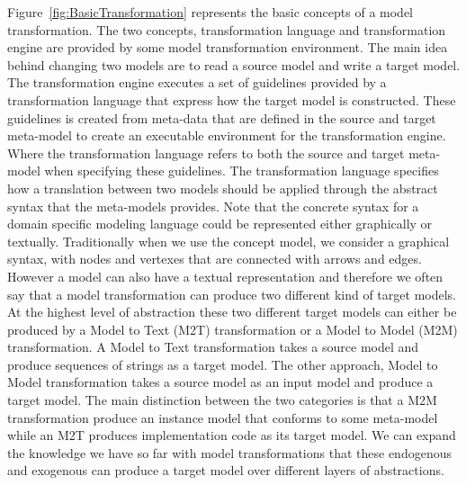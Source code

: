Figure~\ref{fig:BasicTransformation} represents the basic concepts
of a model transformation. The two concepts, transformation language and
transformation engine are provided by some model transformation environment.
The main idea behind changing two models are to read a source model and write a
target model. The transformation engine executes a set of guidelines
provided by a transformation language that express how the target model is
constructed. These guidelines is created from meta-data that are defined in the
source and target meta-model to create an executable environment for the transformation
engine. Where the transformation language refers to both the source and target
meta-model when specifying these guidelines. The transformation language
specifies how a translation between two models should be applied through the
abstract syntax that the meta-models provides. Note that the concrete syntax
for a domain specific modeling language could be represented either graphically
or textually. Traditionally when we use the concept model, we consider a
graphical syntax, with nodes and vertexes that are connected with arrows and
edges. However a model can also have a textual representation and therefore we
often say that a model transformation can produce two different kind of target
models. At the highest level of abstraction these two different target models
can either be produced by a Model to Text (M2T) transformation or a Model to
Model (M2M) transformation. A Model to Text transformation takes a source model
and produce sequences of strings as a target model. The other approach, Model to
Model transformation takes a source model as an input model and produce a
target model. The main distinction between the two categories is that a M2M
transformation produce an instance model that conforms to some meta-model while
an M2T produces implementation code as its target model. We can expand the
knowledge we have so far with model transformations that these endogenous and
exogenous can produce a target model over different layers of abstractions.




